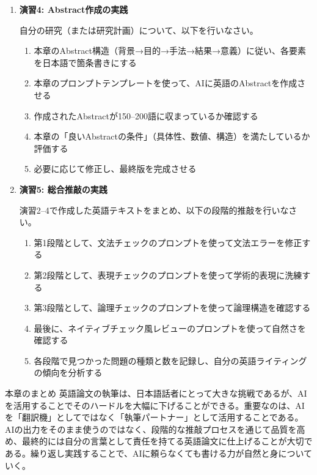 \begin{enumerate}
\item \textbf{演習4: Abstract作成の実践}

自分の研究（または研究計画）について、以下を行いなさい。
\begin{enumerate}
\item 本章のAbstract構造（背景→目的→手法→結果→意義）に従い、各要素を日本語で箇条書きにする
\item 本章のプロンプトテンプレートを使って、AIに英語のAbstractを作成させる
\item 作成されたAbstractが150--200語に収まっているか確認する
\item 本章の「良いAbstractの条件」（具体性、数値、構造）を満たしているか評価する
\item 必要に応じて修正し、最終版を完成させる
\end{enumerate}

\item \textbf{演習5: 総合推敲の実践}

演習2--4で作成した英語テキストをまとめ、以下の段階的推敲を行いなさい。
\begin{enumerate}
\item 第1段階として、文法チェックのプロンプトを使って文法エラーを修正する
\item 第2段階として、表現チェックのプロンプトを使って学術的表現に洗練する
\item 第3段階として、論理チェックのプロンプトを使って論理構造を確認する
\item 最後に、ネイティブチェック風レビューのプロンプトを使って自然さを確認する
\item 各段階で見つかった問題の種類と数を記録し、自分の英語ライティングの傾向を分析する
\end{enumerate}

\end{enumerate}

\vspace{10mm}
\begin{itembox}[l]{本章のまとめ}
英語論文の執筆は、日本語話者にとって大きな挑戦であるが、AIを活用することでそのハードルを大幅に下げることができる。重要なのは、AIを「翻訳機」としてではなく「執筆パートナー」として活用することである。AIの出力をそのまま使うのではなく、段階的な推敲プロセスを通じて品質を高め、最終的には自分の言葉として責任を持てる英語論文に仕上げることが大切である。繰り返し実践することで、AIに頼らなくても書ける力が自然と身についていく。
\end{itembox}
